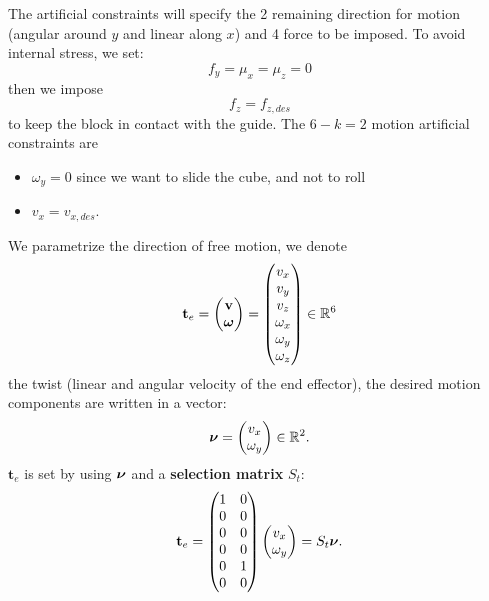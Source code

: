 \documentclass[10pt, a4paper]{report}
\begin{document}
The artificial constraints will specify the 2 remaining direction for motion (angular around $y$ and linear along $x$) and 4 force to be imposed. To avoid internal stress, we set:\begin{equation}
    f_y=\mu_x=\mu_z=0
\end{equation}
then we impose $$ f_z=f_{z,des}$$ to keep the block in contact with the guide. The $6-k=2$ motion artificial constraints are\begin{itemize}
    \item $\omega_y=0$ since we want to slide the cube, and not to roll 
    \item $v_x=v_{x,des}$.
\end{itemize}
We parametrize the direction of free motion, we denote \begin{equation}
    \mathbf t_e=\begin{pmatrix}
        \mathbf v\\ {\boldsymbol{\omega}} 
    \end{pmatrix}=\begin{pmatrix}
        v_x\\v_y\\v_z\\\omega_x\\\omega_y\\\omega_z
    \end{pmatrix}\in {\mathbb R}^6
\end{equation}
the twist (linear and angular velocity of the end effector), the desired motion components are written in a vector:\begin{equation}
    \boldsymbol{\nu}=\begin{pmatrix}
        v_x\\ \omega_y
    \end{pmatrix}\in {\mathbb R}^2.
\end{equation}
$\mathbf t_e$ is set by using  ${\boldsymbol{\nu}}$ and a \textbf{selection matrix} $S_t$:\begin{equation}
    \mathbf t_e=\begin{pmatrix}
        1&0\\ 0&0 \\ 0&0 \\ 0&0 \\ 0&1\\ 0&0
    \end{pmatrix}\begin{pmatrix}
        v_x\\ \omega_y
    \end{pmatrix}=S_t{\boldsymbol{\nu}}.
\end{equation}
\end{document}
